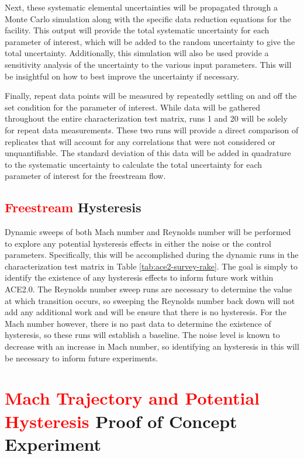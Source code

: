 Next, these systematic elemental uncertainties will be propagated through a Monte Carlo simulation along with the specific data reduction equations for the facility. This output will provide the total systematic uncertainty for each parameter of interest, which will be added to the random uncertainty to give the total uncertainty. Additionally, this simulation will also be used provide a sensitivity analysis of the uncertainty to the various input parameters. This will be insightful on how to best improve the uncertainty if necessary.

Finally, repeat data points will be measured by repeatedly settling on and off the set condition for the parameter of interest. While data will be gathered throughout the entire characterization test matrix, runs 1 and 20 will be solely for repeat data measurements. These two runs will provide a direct comparison of replicates that will account for any correlations that were not considered or unquantifiable. The standard deviation of this data will be added in quadrature to the systematic uncertainty to calculate the total uncertainty for each parameter of interest for the freestream flow.

\subsection{\textcolor{red}{Freestream} Hysteresis}

Dynamic sweeps of both Mach number and Reynolds number will be performed to explore any potential hysteresis effects in either the noise or the control parameters. Specifically, this will be accomplished during the dynamic runs in the characterization test matrix in Table \ref{tab:ace2-survey-rake}. The goal is simply to identify the existence of any hysteresis effects to inform future work within ACE2.0. The Reynolds number sweep runs are necessary to determine the value at which transition occurs, so sweeping the Reynolds number back down will not add any additional work and will be ensure that there is no hysteresis. For the Mach number however, there is no past data to determine the existence of hysteresis, so these runs will establish a baseline. The noise level is known to decrease with an increase in Mach number, so identifying an hysteresis in this will be necessary to inform future experiments.

\section{\textcolor{red}{Mach Trajectory and Potential Hysteresis} Proof of Concept Experiment}

